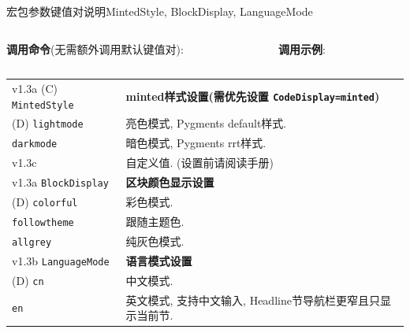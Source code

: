 \begin{frame}{ 宏包参数键值对说明}{MintedStyle, BlockDisplay, LanguageMode}
	\vspace*{-1.6ex}
	\begin{columns}[T, onlytextwidth]%
		\begin{column}{.5\textwidth}
			\textbf{调用命令}(无需额外调用默认键值对):\\
		\end{column}
		\begin{column}{.5\textwidth}
			\textbf{调用示例}:\\
		\end{column}
	\end{columns}

	\begin{table}[h]
		\centering
		\begin{tabular}{>{\raggedleft\arraybackslash}p{}p{}}
			v1.3a (C) \alert{\texttt{MintedStyle}} & \textbf{minted样式设置(需优先设置 \texttt{\alert{CodeDisplay}=minted})}\\
			(D) \texttt{lightmode} & 亮色模式, Pygments default样式.\\
			\texttt{darkmode} & 暗色模式, Pygments rrt样式.\\
			v1.3c \Arg{custom} & 自定义值. (设置前请阅读手册)\\
			\midrule
			v1.3a \alert{\texttt{BlockDisplay}} & \textbf{区块颜色显示设置}\\
			(D) \texttt{colorful} & 彩色模式.\\
			\texttt{followtheme} & 跟随主题色.\\
			\texttt{allgrey} & 纯灰色模式.\\
			\midrule
			v1.3b \alert{\texttt{LanguageMode}} & \textbf{语言模式设置}\\
			(D) \texttt{cn} & 中文模式.\\
			\texttt{en} & 英文模式, 支持中文输入, Headline节导航栏更窄且只显示当前节.\\
		\end{tabular}
	\end{table}
	\vspace*{-2ex}
\end{frame}

